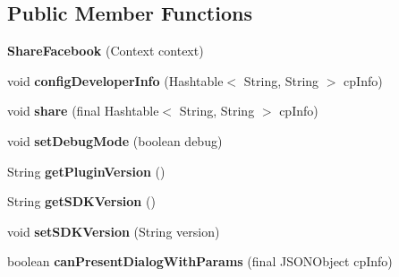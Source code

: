 \subsection*{Public Member Functions}
\begin{DoxyCompactItemize}
\item 
\mbox{\label{classorg_1_1cocos2dx_1_1plugin_1_1ShareFacebook_a634e4e74c391eb8c0f693624f1dd9276}} 
{\bfseries Share\+Facebook} (Context context)
\item 
\mbox{\label{classorg_1_1cocos2dx_1_1plugin_1_1ShareFacebook_a01c4495941913475ac7dcd0de0b3db97}} 
void {\bfseries config\+Developer\+Info} (Hashtable$<$ String, String $>$ cp\+Info)
\item 
\mbox{\label{classorg_1_1cocos2dx_1_1plugin_1_1ShareFacebook_ae8355379f78c330f562333674f4ce073}} 
void {\bfseries share} (final Hashtable$<$ String, String $>$ cp\+Info)
\item 
\mbox{\label{classorg_1_1cocos2dx_1_1plugin_1_1ShareFacebook_a414db619065bd0c3d0d63123d47db919}} 
void {\bfseries set\+Debug\+Mode} (boolean debug)
\item 
\mbox{\label{classorg_1_1cocos2dx_1_1plugin_1_1ShareFacebook_ac9136fff67e08c8c6fa9dd8cd08f3d5c}} 
String {\bfseries get\+Plugin\+Version} ()
\item 
\mbox{\label{classorg_1_1cocos2dx_1_1plugin_1_1ShareFacebook_ae2ed1c42aa537b59ff61a787de1784c5}} 
String {\bfseries get\+S\+D\+K\+Version} ()
\item 
\mbox{\label{classorg_1_1cocos2dx_1_1plugin_1_1ShareFacebook_ae905aa9158c820c273502bf80fe88762}} 
void {\bfseries set\+S\+D\+K\+Version} (String version)
\item 
\mbox{\label{classorg_1_1cocos2dx_1_1plugin_1_1ShareFacebook_a068240fda413e76f682e6e7d6004a583}} 
boolean {\bfseries can\+Present\+Dialog\+With\+Params} (final J\+S\+O\+N\+Object cp\+Info)

\end{DoxyCompactItemize}

